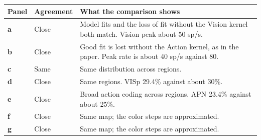\begin{longtable}{@{}p{1.1cm}p{2.5cm}p{11.8cm}@{}}
\toprule
Panel & Agreement & What the comparison shows \\
\midrule
\endhead
\textbf{a} & Close & Model fits and the loss of fit without the Vision kernel both match. Vision peak about 50 sp/s. \\
\textbf{b} & Close & Good fit is lost without the Action kernel, as in the paper. Peak rate is about 40 sp/s against 80. \\
\textbf{c} & Same & Same distribution across regions. \\
\textbf{d} & Close & Same regions. VISp 29.4\% against about 30\%. \\
\textbf{e} & Close & Broad action coding across regions. APN 23.4\% against about 25\%. \\
\textbf{f} & Close & Same map; the color steps are approximated. \\
\textbf{g} & Close & Same map; the color steps are approximated. \\
\bottomrule
\end{longtable}
